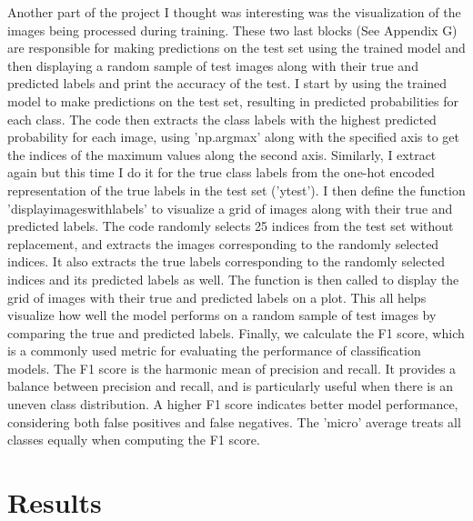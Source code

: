 \documentclass[paper=a4, fontsize=11pt,twoside]{scrartcl}
\begin{document}
Another part of the project I thought was interesting was the visualization of the images being processed during training. These two last blocks (See Appendix G) are responsible for making predictions on the test set using the trained model and then displaying a random sample of test images along with their true and predicted labels and print the accuracy of the test. I start by using the trained model to make predictions on the test set, resulting in predicted probabilities for each class. The code then extracts the class labels with the highest predicted probability for each image, using 'np.argmax' along with the specified axis to get the indices of the maximum values along the second axis. Similarly, I extract again but this time I do it for the true class labels from the one-hot encoded representation of the true labels in the test set ('y\textunderscore test'). I then define the function 'display\textunderscore images\textunderscore with\textunderscore labels' to visualize a grid of images along with their true and predicted labels. The code randomly selects 25 indices from the test set without replacement, and extracts the images corresponding to the randomly selected indices. It also extracts the true labels corresponding to the randomly selected indices and its predicted labels as well. The function is then called to display the grid of images with their true and predicted labels on a plot. This all helps visualize how well the model performs on a random sample of test images by comparing the true and predicted labels. Finally, we calculate the F1 score, which is a commonly used metric for evaluating the performance of classification models. The F1 score is the harmonic mean of precision and recall. It provides a balance between precision and recall, and is particularly useful when there is an uneven class distribution. A higher F1 score indicates better model performance, considering both false positives and false negatives. The 'micro' average treats all classes equally when computing the F1 score. 

\section{Results}

\end{document}
